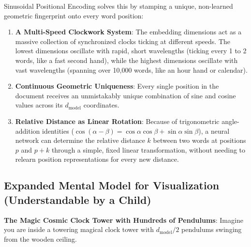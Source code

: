 \documentclass[11pt,a4paper]{article}
\theoremstyle{definition}
\begin{document}
Sinusoidal Positional Encoding solves this by stamping a unique, non-learned geometric fingerprint onto every word position:
\begin{enumerate}
    \item \textbf{A Multi-Speed Clockwork System}: The embedding dimensions act as a massive collection of synchronized clocks ticking at different speeds. The lowest dimensions oscillate with rapid, short wavelengths (ticking every 1 to 2 words, like a fast second hand), while the highest dimensions oscillate with vast wavelengths (spanning over 10,000 words, like an hour hand or calendar).
    \item \textbf{Continuous Geometric Uniqueness}: Every single position in the document receives an unmistakably unique combination of sine and cosine values across its $d_{\text{model}}$ coordinates.
    \item \textbf{Relative Distance as Linear Rotation}: Because of trigonometric angle-addition identities ($\cos(\alpha - \beta) = \cos \alpha \cos \beta + \sin \alpha \sin \beta$), a neural network can determine the relative distance $k$ between two words at positions $p$ and $p+k$ through a simple, fixed linear transformation, without needing to relearn position representations for every new distance.
\end{enumerate}

\subsection{Expanded Mental Model for Visualization (Understandable by a Child)}
\textbf{The Magic Cosmic Clock Tower with Hundreds of Pendulums}:
Imagine you are inside a towering magical clock tower with $d_{\text{model}}/2$ pendulums swinging from the wooden ceiling.
\end{document}
